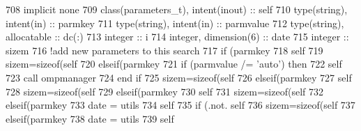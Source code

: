 \begin{DoxyCode}
708     \textcolor{keywordtype}{implicit none}
709     \textcolor{keywordtype}{class}(parameters\_t), \textcolor{keywordtype}{intent(inout)} :: self
710     \textcolor{keywordtype}{type}(string), \textcolor{keywordtype}{intent(in)} :: parmkey
711     \textcolor{keywordtype}{type}(string), \textcolor{keywordtype}{intent(in)} :: parmvalue
712     \textcolor{keywordtype}{type}(string), \textcolor{keywordtype}{allocatable} :: dc(:)
713     \textcolor{keywordtype}{integer} :: i
714     \textcolor{keywordtype}{integer}, \textcolor{keywordtype}{dimension(6)} :: date
715     \textcolor{keywordtype}{integer} :: sizem
716     \textcolor{comment}{!add new parameters to this search}
717     \textcolor{keywordflow}{if} (parmkey%
718         self%
719         sizem=sizeof(self%
720     \textcolor{keywordflow}{elseif}(parmkey%
721         \textcolor{keywordflow}{if} (parmvalue /= \textcolor{stringliteral}{'auto'}) \textcolor{keywordflow}{then}
722             self%
723             \textcolor{keyword}{call }ompmanager%
724 \textcolor{keywordflow}{        end if}
725         sizem=sizeof(self%
726     \textcolor{keywordflow}{elseif}(parmkey%
727         self%
728         sizem=sizeof(self%
729     \textcolor{keywordflow}{elseif}(parmkey%
730         self%
731         sizem=sizeof(self%
732     \textcolor{keywordflow}{elseif}(parmkey%
733         date = utils%
734         self%
735         \textcolor{keywordflow}{if} (.not. self%
736         sizem=sizeof(self%
737     \textcolor{keywordflow}{elseif}(parmkey%
738         date = utils%
739         self%

\end{DoxyCode}
